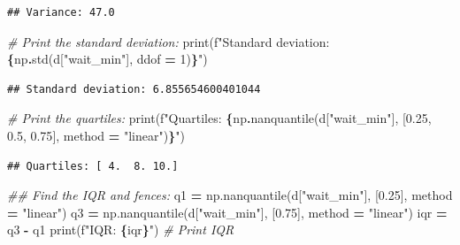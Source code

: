 \documentclass[
]{article}
\newenvironment{Shaded}{\begin{snugshade}}{\end{snugshade}}
\newcommand{\BuiltInTok}[1]{#1}
\newcommand{\CommentTok}[1]{\textcolor[rgb]{0.56,0.35,0.01}{\textit{#1}}}
\newcommand{\DecValTok}[1]{\textcolor[rgb]{0.00,0.00,0.81}{#1}}
\newcommand{\FloatTok}[1]{\textcolor[rgb]{0.00,0.00,0.81}{#1}}
\newcommand{\NormalTok}[1]{#1}
\newcommand{\OperatorTok}[1]{\textcolor[rgb]{0.81,0.36,0.00}{\textbf{#1}}}
\newcommand{\SpecialCharTok}[1]{\textcolor[rgb]{0.81,0.36,0.00}{\textbf{#1}}}
\newcommand{\SpecialStringTok}[1]{\textcolor[rgb]{0.31,0.60,0.02}{#1}}
\newcommand{\StringTok}[1]{\textcolor[rgb]{0.31,0.60,0.02}{#1}}
\begin{document}
\begin{verbatim}
## Variance: 47.0
\end{verbatim}

\begin{Shaded}
\begin{Highlighting}[]
\CommentTok{\# Print the standard deviation:}
\BuiltInTok{print}\NormalTok{(}\SpecialStringTok{f"Standard deviation: }\SpecialCharTok{\{}\NormalTok{np}\SpecialCharTok{.}\NormalTok{std(d[}\StringTok{"wait\_min"}\NormalTok{], ddof }\OperatorTok{=} \DecValTok{1}\NormalTok{)}\SpecialCharTok{\}}\SpecialStringTok{"}\NormalTok{)}
\end{Highlighting}
\end{Shaded}

\begin{verbatim}
## Standard deviation: 6.855654600401044
\end{verbatim}

\begin{Shaded}
\begin{Highlighting}[]
\CommentTok{\# Print the quartiles:}
\BuiltInTok{print}\NormalTok{(}\SpecialStringTok{f"Quartiles: }\SpecialCharTok{\{}\NormalTok{np}\SpecialCharTok{.}\NormalTok{nanquantile(d[}\StringTok{"wait\_min"}\NormalTok{], [}\FloatTok{0.25}\NormalTok{, }\FloatTok{0.5}\NormalTok{, }\FloatTok{0.75}\NormalTok{], method }\OperatorTok{=} \StringTok{"linear"}\NormalTok{)}\SpecialCharTok{\}}\SpecialStringTok{"}\NormalTok{)}
\end{Highlighting}
\end{Shaded}

\begin{verbatim}
## Quartiles: [ 4.  8. 10.]
\end{verbatim}

\begin{Shaded}
\begin{Highlighting}[]
\CommentTok{\#\# Find the IQR and fences:}
\NormalTok{q1 }\OperatorTok{=}\NormalTok{ np.nanquantile(d[}\StringTok{"wait\_min"}\NormalTok{], [}\FloatTok{0.25}\NormalTok{], method }\OperatorTok{=} \StringTok{"linear"}\NormalTok{)}
\NormalTok{q3 }\OperatorTok{=}\NormalTok{ np.nanquantile(d[}\StringTok{"wait\_min"}\NormalTok{], [}\FloatTok{0.75}\NormalTok{], method }\OperatorTok{=} \StringTok{"linear"}\NormalTok{)}
\NormalTok{iqr }\OperatorTok{=}\NormalTok{ q3 }\OperatorTok{{-}}\NormalTok{ q1}
\BuiltInTok{print}\NormalTok{(}\SpecialStringTok{f"IQR: }\SpecialCharTok{\{}\NormalTok{iqr}\SpecialCharTok{\}}\SpecialStringTok{"}\NormalTok{) }\CommentTok{\# Print IQR}
\end{Highlighting}
\end{Shaded}
\end{document}
